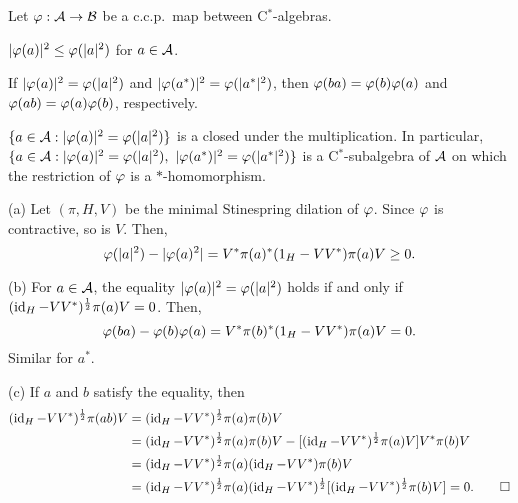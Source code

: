 \documentclass{../../../small}
\begin{document}
\begin{prop}
Let $\varphi:\mathcal{A}\to\mathcal{B}$ be a c.c.p.~map between C$^*$-algebras.
\begin{parts}
\item $|\varphi(a)|^2\le\varphi(|a|^2)$ for $a\in\mathcal{A}$.
\item If $|\varphi(a)|^2=\varphi(|a|^2)$ and $|\varphi(a^*)|^2=\varphi(|a^*|^2)$, then $\varphi(ba)=\varphi(b)\varphi(a)$ and $\varphi(ab)=\varphi(a)\varphi(b)$, respectively.
\item $\{a\in\mathcal{A}:|\varphi(a)|^2=\varphi(|a|^2)\}$ is a closed under the multiplication.
In particular, $\{a\in\cA:|\f(a)|^2=\f(|a|^2),\ |\f(a^*)|^2=\f(|a^*|^2)\}$ is a C$^*$-subalgebra of $\mathcal{A}$ on which the restriction of $\varphi$ is a $*$-homomorphism.
\end{parts}
\end{prop}
\begin{pf}
(a)
Let $(\pi,H,V)$ be the minimal Stinespring dilation of $\varphi$.
Since $\varphi$ is contractive, so is $V$.
Then,
\[\varphi(|a|^2)-|\varphi(a)^2|=V^*\pi(a)^*(1_H-VV^*)\pi(a)V\ge0.\]

(b)
For $a\in\mathcal{A}$, the equality $|\varphi(a)|^2=\varphi(|a|^2)$ holds if and only if $(\operatorname{id}_H-VV^*)^{\frac12}\pi(a)V=0$.
Then,
\[\varphi(ba)-\varphi(b)\varphi(a)=V^*\pi(b)^*(1_H-VV^*)\pi(a)V=0.\]
Similar for $a^*$.

(c)
If $a$ and $b$ satisfy the equality, then
\begin{align*}
(\operatorname{id}_H-VV^*)^{\frac12}\pi(ab)V
&=(\operatorname{id}_H-VV^*)^{\frac12}\pi(a)\pi(b)V\\
&=(\operatorname{id}_H-VV^*)^{\frac12}\pi(a)\pi(b)V-[(\operatorname{id}_H-VV^*)^{\frac12}\pi(a)V]V^*\pi(b)V\\
&=(\operatorname{id}_H-VV^*)^{\frac12}\pi(a)(\operatorname{id}_H-VV^*)\pi(b)V\\
&=(\operatorname{id}_H-VV^*)^{\frac12}\pi(a)(\operatorname{id}_H-VV^*)^{\frac12}[(\operatorname{id}_H-VV^*)^{\frac12}\pi(b)V]=0.\qedhere
\end{align*}
\end{pf}
\end{document}
